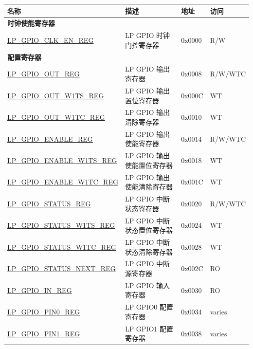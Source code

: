 \begin{longtable}{ | p{6.2cm} | p{6.9cm} | p{1.3cm} | p{1.8cm} | }
\hline\rowcolor{lightgray}
\textbf{名称} & \textbf{描述} &  \textbf{地址} & \textbf{访问} \\ \hline
\endhead
\multicolumn{4}{|l|}{\textbf{时钟使能寄存器}} \\ \hline
\hyperref[regdesc:LPGPIOCLKENREG]{LP\_GPIO\_CLK\_EN\_REG} & LP GPIO 时钟门控寄存器 & 0x0000 & R/W \\ \hline

\multicolumn{4}{|l|}{\textbf{配置寄存器}} \\ \hline
\hyperref[regdesc:LPGPIOOUTREG]{LP\_GPIO\_OUT\_REG} & LP GPIO 输出寄存器 & 0x0008 & R/W/WTC \\ \hline
\hyperref[regdesc:LPGPIOOUTW1TSREG]{LP\_GPIO\_OUT\_W1TS\_REG} & LP GPIO 输出置位寄存器 & 0x000C & WT \\ \hline
\hyperref[regdesc:LPGPIOOUTW1TCREG]{LP\_GPIO\_OUT\_W1TC\_REG} & LP GPIO 输出清除寄存器 & 0x0010 & WT \\ \hline
\hyperref[regdesc:LPGPIOENABLEREG]{LP\_GPIO\_ENABLE\_REG} & LP GPIO 输出使能寄存器 & 0x0014 & R/W/WTC \\ \hline
\hyperref[regdesc:LPGPIOENABLEW1TSREG]{LP\_GPIO\_ENABLE\_W1TS\_REG} & LP GPIO 输出使能置位寄存器& 0x0018 & WT \\ \hline
\hyperref[regdesc:LPGPIOENABLEW1TCREG]{LP\_GPIO\_ENABLE\_W1TC\_REG} & LP GPIO 输出使能清除寄存器 & 0x001C & WT \\ \hline
\hyperref[regdesc:LPGPIOSTATUSREG]{LP\_GPIO\_STATUS\_REG} & LP GPIO 中断状态寄存器 & 0x0020 & R/W/WTC \\ \hline
\hyperref[regdesc:LPGPIOSTATUSW1TSREG]{LP\_GPIO\_STATUS\_W1TS\_REG} & LP GPIO 中断状态置位寄存器 & 0x0024 & WT \\ \hline
\hyperref[regdesc:LPGPIOSTATUSW1TCREG]{LP\_GPIO\_STATUS\_W1TC\_REG} & LP GPIO 中断状态清除寄存器 & 0x0028 & WT \\ \hline
\hyperref[regdesc:LPGPIOSTATUSNEXTREG]{LP\_GPIO\_STATUS\_NEXT\_REG} & LP GPIO 中断源寄存器 & 0x002C & RO \\ \hline
\hyperref[regdesc:LPGPIOINREG]{LP\_GPIO\_IN\_REG} & LP GPIO 输入寄存器 & 0x0030 & RO \\ \hline
\hyperref[regdesc:LPGPIOPINNREG]{LP\_GPIO\_PIN0\_REG} & LP GPIO0 配置寄存器 & 0x0034 & varies \\ \hline
\hyperref[regdesc:LPGPIOPINNREG]{LP\_GPIO\_PIN1\_REG} & LP GPIO1 配置寄存器 & 0x0038 & varies \\ \hline

\end{longtable}
